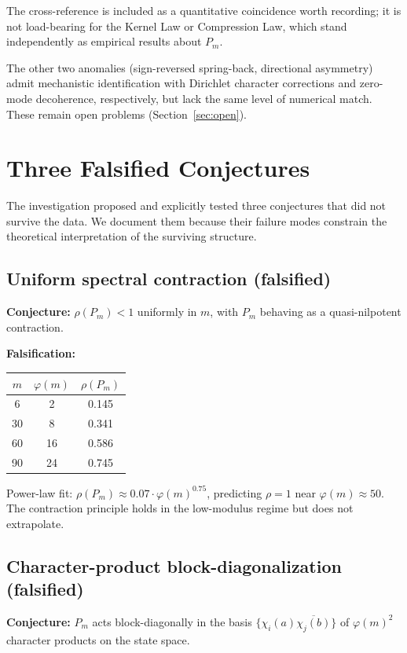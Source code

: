 \documentclass[11pt,a4paper]{article}
\begin{document}
The cross-reference is included as a quantitative coincidence worth recording; it is not load-bearing for the Kernel Law or Compression Law, which stand independently as empirical results about $P_m$.

The other two anomalies (sign-reversed spring-back, directional asymmetry) admit mechanistic identification with Dirichlet character corrections and zero-mode decoherence, respectively, but lack the same level of numerical match. These remain open problems (Section~\ref{sec:open}).

\section{Three Falsified Conjectures}
\label{sec:falsified}

The investigation proposed and explicitly tested three conjectures that did not survive the data. We document them because their failure modes constrain the theoretical interpretation of the surviving structure.

\subsection{Uniform spectral contraction (falsified)}

\textbf{Conjecture:} $\rho(P_m) < 1$ uniformly in $m$, with $P_m$ behaving as a quasi-nilpotent contraction.

\textbf{Falsification:}
\begin{center}
\begin{tabular}{ccc}
\toprule
$m$ & $\varphi(m)$ & $\rho(P_m)$ \\
\midrule
6 & 2 & 0.145 \\
30 & 8 & 0.341 \\
60 & 16 & 0.586 \\
90 & 24 & 0.745 \\
\bottomrule
\end{tabular}
\end{center}
Power-law fit: $\rho(P_m) \approx 0.07 \cdot \varphi(m)^{0.75}$, predicting $\rho = 1$ near $\varphi(m) \approx 50$. The contraction principle holds in the low-modulus regime but does not extrapolate.

\subsection{Character-product block-diagonalization (falsified)}

\textbf{Conjecture:} $P_m$ acts block-diagonally in the basis $\{\chi_i(a) \overline{\chi_j(b)}\}$ of $\varphi(m)^2$ character products on the state space.
\end{document}
